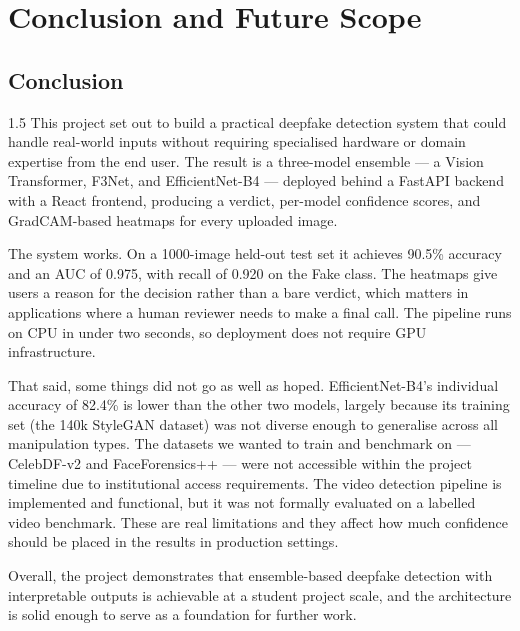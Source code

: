 \chapter{Conclusion and Future Scope}

\section{Conclusion}

\begin{spacing}{1.5}
This project set out to build a practical deepfake detection system that could handle real-world inputs without requiring specialised hardware or domain expertise from the end user. The result is a three-model ensemble --- a Vision Transformer, F3Net, and EfficientNet-B4 --- deployed behind a FastAPI backend with a React frontend, producing a verdict, per-model confidence scores, and GradCAM-based heatmaps for every uploaded image.

The system works. On a 1000-image held-out test set it achieves 90.5\% accuracy and an AUC of 0.975, with recall of 0.920 on the Fake class. The heatmaps give users a reason for the decision rather than a bare verdict, which matters in applications where a human reviewer needs to make a final call. The pipeline runs on CPU in under two seconds, so deployment does not require GPU infrastructure.

That said, some things did not go as well as hoped. EfficientNet-B4's individual accuracy of 82.4\% is lower than the other two models, largely because its training set (the 140k StyleGAN dataset) was not diverse enough to generalise across all manipulation types. The datasets we wanted to train and benchmark on --- CelebDF-v2 and FaceForensics++ --- were not accessible within the project timeline due to institutional access requirements. The video detection pipeline is implemented and functional, but it was not formally evaluated on a labelled video benchmark. These are real limitations and they affect how much confidence should be placed in the results in production settings.

Overall, the project demonstrates that ensemble-based deepfake detection with interpretable outputs is achievable at a student project scale, and the architecture is solid enough to serve as a foundation for further work.
\end{spacing}

